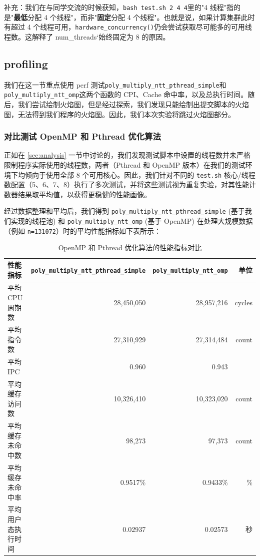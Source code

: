 \documentclass[a4paper]{article}
\begin{document}
补充：我们在与同学交流的时候获知，\texttt{bash test.sh 2 4 4}里的"4 线程"指的是"\textbf{最低}分配 4 个线程"，而非"\textbf{固定}分配 4 个线程"。也就是说，如果计算集群此时有超过 4 个线程可用，\texttt{hardware\_concurrency()}仍会尝试获取尽可能多的可用线程数。这解释了 num\_threads`始终固定为 8 的原因。

\subsection{profiling}

我们在这一节重点使用 perf 测试\texttt{poly\_multiply\_ntt\_pthread\_simple}和\texttt{poly\_multiply\_ntt\_omp}这两个函数的 CPI、Cache 命中率，以及总执行时间。随后，我们尝试绘制火焰图，但是经过探索，我们发现只能绘制出提交脚本的火焰图，无法得到我们程序的火焰图。因此，我们本次实验将跳过火焰图部分。

\subsubsection{对比测试 OpenMP 和 Pthread 优化算法}

正如在 \ref{sec:analysis} 一节中讨论的，我们发现测试脚本中设置的线程数并未严格限制程序实际使用的线程数，两者（Pthread 和 OpenMP 版本）在我们的测试环境下均倾向于使用全部 8 个可用核心。因此，我们针对不同的 \texttt{test.sh} 核心/线程数配置（5、6、7、8）执行了多次测试，并将这些测试视为重复实验，对其性能计数器结果取平均值，以获得更稳健的性能画像。

经过数据整理和平均后，我们得到 \texttt{poly\_multiply\_ntt\_pthread\_simple} (基于我们实现的线程池) 和 \texttt{poly\_multiply\_ntt\_omp} (基于 OpenMP) 在处理大规模数据（例如 \texttt{n=131072}）时的平均性能指标如下表所示：

\begin{table}[htbp]
\centering
\begin{tabular}{lrrr}
\toprule
性能指标 & \texttt{poly\_multiply\_ntt\_pthread\_simple} & \texttt{poly\_multiply\_ntt\_omp} & 单位 \\
\midrule
平均 CPU 周期数 & 28,450,050 & 28,957,216 & cycles \\
平均指令数 & 27,310,929 & 27,314,484 & count \\
平均 IPC & 0.960 & 0.943 & \\
平均缓存访问数 & 10,326,410 & 10,323,020 & count \\
平均缓存未命中数 & 98,273 & 97,373 & count \\
平均缓存未命中率 & 0.9517\% & 0.9433\% & \% \\
平均用户态执行时间 & 0.02937 & 0.02573 & 秒 \\
\bottomrule
\end{tabular}
\caption{OpenMP 和 Pthread 优化算法的性能指标对比}
\end{table}
\end{document}
